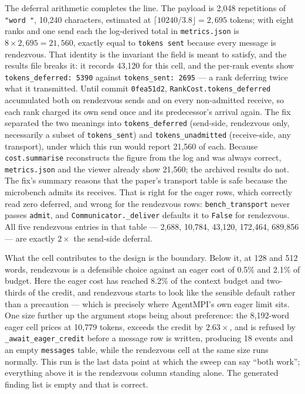 \documentclass[11pt]{article}
\begin{document}
The deferral arithmetic completes the line. The payload is 2{,}048 repetitions of
\texttt{"word "}, 10{,}240 characters, estimated at
$\lceil 10240/3.8 \rfloor = 2{,}695$ tokens; with eight ranks and one send each the
log-derived total in \texttt{metrics.json} is $8 \times 2{,}695 = 21{,}560$, exactly
equal to \texttt{tokens sent} because every message is rendezvous. That identity is
the invariant the field is meant to satisfy, and the results file breaks it: it
records 43{,}120 for this cell, and the per-rank events show
\texttt{tokens\_deferred: 5390} against \texttt{tokens\_sent: 2695} --- a rank
deferring twice what it transmitted. Until commit \texttt{0fea51d2},
\texttt{RankCost.tokens\_deferred} accumulated both on rendezvous sends and on every
non-admitted receive, so each rank charged its own send once and its predecessor's
arrival again. The fix separated the two meanings into \texttt{tokens\_deferred}
(send-side, rendezvous only, necessarily a subset of \texttt{tokens\_sent}) and
\texttt{tokens\_unadmitted} (receive-side, any transport), under which this run would
report 21{,}560 of each. Because \texttt{cost.summarise} reconstructs the figure from
the log and was always correct, \texttt{metrics.json} and the viewer already show
21{,}560; the archived results do not. The fix's summary reasons that the paper's
transport table is safe because the microbench admits its receives. That is right for
the eager rows, which correctly read zero deferred, and wrong for the rendezvous
rows: \texttt{bench\_transport} never passes \texttt{admit}, and
\texttt{Communicator.\_deliver} defaults it to \texttt{False} for rendezvous. All five
rendezvous entries in that table --- 2{,}688, 10{,}784, 43{,}120, 172{,}464, 689{,}856
--- are exactly $2\times$ the send-side deferral.

What the cell contributes to the design is the boundary. Below it, at 128 and 512
words, rendezvous is a defensible choice against an eager cost of 0.5\% and 2.1\% of
budget. Here the eager cost has reached 8.2\% of the context budget and two-thirds of
the credit, and rendezvous starts to look like the sensible default rather than a
precaution --- which is precisely where AgentMPI's own eager limit sits. One size
further up the argument stops being about preference: the 8{,}192-word eager cell
prices at 10{,}779 tokens, exceeds the credit by $2.63\times$, and is refused by
\texttt{\_await\_eager\_credit} before a message row is written, producing 18 events
and an empty \texttt{messages} table, while the rendezvous cell at the same size runs
normally. This run is the last data point at which the sweep can say ``both work'';
everything above it is the rendezvous column standing alone. The generated finding
list is empty and that is correct.
\end{document}
